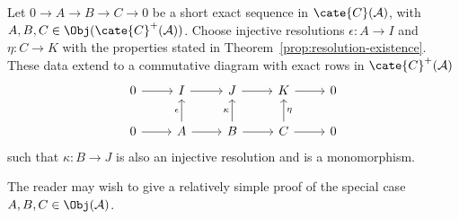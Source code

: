 \begin{proposition}\label{prop:horseshoe}
	Let $0\to A\to B\to C\to0$ be a short exact sequence in
	$\cate{C}(\mathcal{A})$, with
	$A,B,C\in\Obj(\cate{C}^+(\mathcal{A}))$. Choose injective resolutions
	$\epsilon:A\to I$ and $\eta:C\to K$ with the properties stated in
	Theorem~\ref{prop:resolution-existence}. These data extend to a
	commutative diagram with exact rows in $\cate{C}^+(\mathcal{A})$
	\[\begin{tikzcd}
		0 \arrow[r] & I \arrow[r] & J \arrow[r] & K \arrow[r] & 0 \\
		0 \arrow[r] & A \arrow[r] \arrow[u, "\epsilon"] & B \arrow[r] \arrow[u, "\kappa"] & C \arrow[r] \arrow[u, "\eta"'] & 0
	\end{tikzcd}\]
	such that $\kappa:B\to J$ is also an injective resolution and is a
	monomorphism.
\end{proposition}

The reader may wish to give a relatively simple proof of the special case
$A,B,C\in\Obj(\mathcal{A})$.

